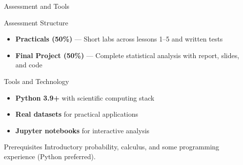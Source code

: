 
\begin{frame}{Assessment and Tools}
  \begin{block}{Assessment Structure}
    \begin{itemize}
      \item \textbf{Practicals (50\%)} — Short labs across lessons 1–5 and written tests
      \item \textbf{Final Project (50\%)} — Complete statistical analysis with report, slides, and code
    \end{itemize}
  \end{block}

  \begin{block}{Tools and Technology}
    \begin{itemize}
      \item \textbf{Python 3.9+} with scientific computing stack
      \item \textbf{Real datasets} for practical applications
      \item \textbf{Jupyter notebooks} for interactive analysis
    \end{itemize}
  \end{block}

  \begin{block}{Prerequisites}
    Introductory probability, calculus, and some programming experience (Python preferred).
  \end{block}
\end{frame}

